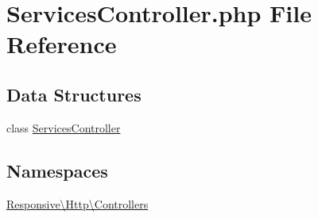 \hypertarget{_services_controller_8php}{}\section{Services\+Controller.\+php File Reference}
\label{_services_controller_8php}
\subsection*{Data Structures}
\begin{DoxyCompactItemize}
\item 
class \mbox{\hyperlink{class_responsive_1_1_http_1_1_controllers_1_1_services_controller}{Services\+Controller}}
\end{DoxyCompactItemize}
\subsection*{Namespaces}
\begin{DoxyCompactItemize}
\item 
 \mbox{\hyperlink{namespace_responsive_1_1_http_1_1_controllers}{Responsive\textbackslash{}\+Http\textbackslash{}\+Controllers}}
\end{DoxyCompactItemize}
